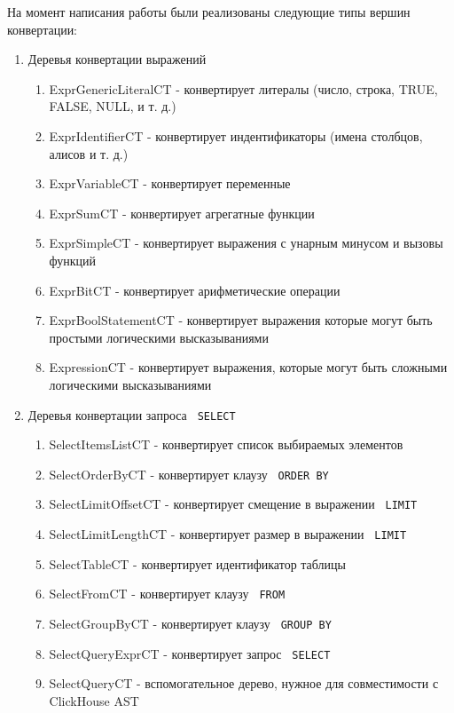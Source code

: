 На момент написания работы были реализованы следующие типы вершин конвертации:
\begin{enumerate}
    \item Деревья конвертации выражений \begin{enumerate}
        \item ExprGenericLiteralCT - конвертирует литералы (число, строка, TRUE, FALSE, NULL, и т. д.)
        \item ExprIdentifierCT - конвертирует индентификаторы (имена столбцов, алисов и т. д.)
        \item ExprVariableCT - конвертирует переменные
        \item ExprSumCT - конвертирует агрегатные функции
        \item ExprSimpleCT - конвертирует выражения с унарным минусом и вызовы функций
        \item ExprBitCT - конвертирует арифметические операции
        \item ExprBoolStatementCT - конвертирует выражения которые могут быть простыми логическими высказываниями
        \item ExpressionCT - конвертирует выражения, которые могут быть сложными логическими высказываниями
    \end{enumerate}
    \item Деревья конвертации запроса \texttt{ SELECT } \begin{enumerate}
        \item SelectItemsListCT - конвертирует список выбираемых элементов
        \item SelectOrderByCT - конвертирует клаузу \texttt{ ORDER BY } 
        \item SelectLimitOffsetCT - конвертирует смещение в выражении \texttt{ LIMIT } 
        \item SelectLimitLengthCT - конвертирует размер в выражении \texttt{ LIMIT } 
        \item SelectTableCT - конвертирует идентификатор таблицы
        \item SelectFromCT - конвертирует клаузу \texttt{ FROM } 
        \item SelectGroupByCT - конвертирует клаузу \texttt{ GROUP BY} 
        \item SelectQueryExprCT - конвертирует запрос \texttt{ SELECT }
        \item SelectQueryCT - вспомогательное дерево, нужное для совместимости с ClickHouse AST

\end{enumerate}
\end{enumerate}
